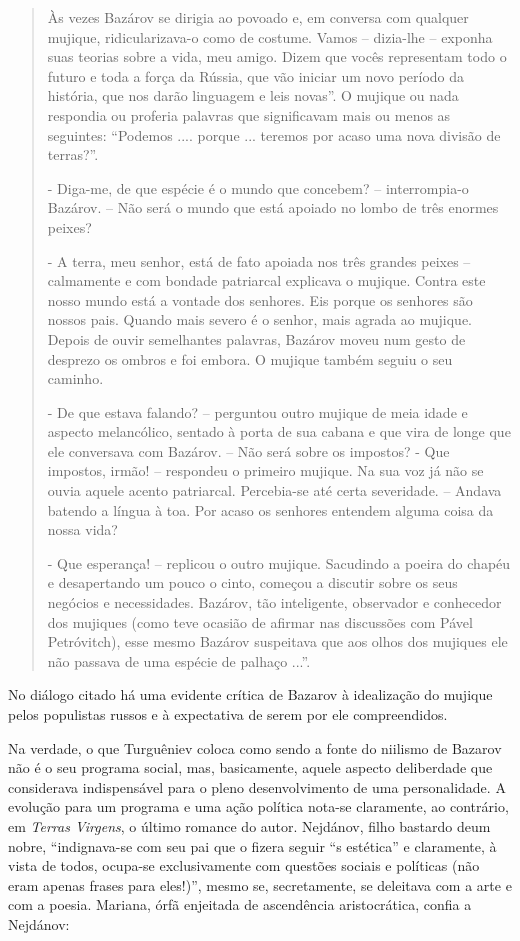\begin{quote}
Às vezes Bazárov se dirigia ao povoado e, em conversa com qualquer
mujique, ridicularizava-o como de costume. Vamos -- dizia-lhe -- exponha
suas teorias sobre a vida, meu amigo. Dizem que vocês representam todo o
futuro e toda a força da Rússia, que vão iniciar um novo período da
história, que nos darão linguagem e leis novas''. O mujique ou nada
respondia ou proferia palavras que significavam mais ou menos as
seguintes: ``Podemos .... porque ... teremos por acaso uma nova divisão
de terras?''.

- Diga-me, de que espécie é o mundo que concebem? -- interrompia-o
Bazárov. -- Não será o mundo que está apoiado no lombo de três enormes
peixes?

- A terra, meu senhor, está de fato apoiada nos três grandes peixes --
calmamente e com bondade patriarcal explicava o mujique. Contra este
nosso mundo está a vontade dos senhores. Eis porque os senhores são
nossos pais. Quando mais severo é o senhor, mais agrada ao mujique.
Depois de ouvir semelhantes palavras, Bazárov moveu num gesto de
desprezo os ombros e foi embora. O mujique também seguiu o seu caminho.

- De que estava falando? -- perguntou outro mujique de meia idade e
aspecto melancólico, sentado à porta de sua cabana e que vira de longe
que ele conversava com Bazárov. -- Não será sobre os impostos? - Que
impostos, irmão! -- respondeu o primeiro mujique. Na sua voz já não se
ouvia aquele acento patriarcal. Percebia-se até certa severidade. --
Andava batendo a língua à toa. Por acaso os senhores entendem alguma
coisa da nossa vida?

- Que esperança! -- replicou o outro mujique. Sacudindo a poeira do
chapéu e desapertando um pouco o cinto, começou a discutir sobre os seus
negócios e necessidades. Bazárov, tão inteligente, observador e
conhecedor dos mujiques (como teve ocasião de afirmar nas discussões com
Pável Petróvitch), esse mesmo Bazárov suspeitava que aos olhos dos
mujiques ele não passava de uma espécie de palhaço ...''.
\end{quote}

No diálogo citado há uma evidente crítica de Bazarov à idealização do
mujique pelos populistas russos e à expectativa de serem por ele
compreendidos.

Na verdade, o que Turguêniev coloca como sendo a fonte do niilismo de
Bazarov não é o seu programa social, mas, basicamente, aquele aspecto
deliberdade que considerava indispensável para o pleno desenvolvimento
de uma personalidade. A evolução para um programa e uma ação política
nota-se claramente, ao contrário, em \emph{Terras Virgens}, o último
romance do autor. Nejdánov, filho bastardo deum nobre, ``indignava-se
com seu pai que o fizera seguir ``s estética'' e claramente, à vista de
todos, ocupa-se exclusivamente com questões sociais e políticas (não
eram apenas frases para eles!)'', mesmo se, secretamente, se deleitava
com a arte e com a poesia. Mariana, órfã enjeitada de ascendência
aristocrática, confia a Nejdánov:

